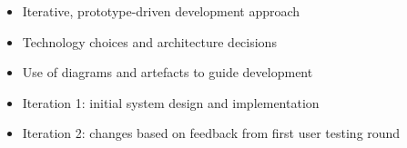 \label{ch:system-development}

\begin{itemize}
    \item Iterative, prototype-driven development approach
    \item Technology choices and architecture decisions
    \item Use of diagrams and artefacts to guide development
    \item Iteration 1: initial system design and implementation
    \item Iteration 2: changes based on feedback from first user testing round
\end{itemize}
